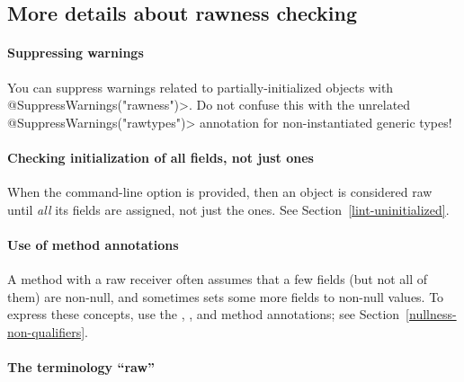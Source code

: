 


\subsection{More details about rawness checking\label{rawness-checking}}


\paragraph{Suppressing warnings}

You can suppress warnings related to partially-initialized objects with
\<@SuppressWarnings("rawness")>.  Do not confuse this with the unrelated
\<@SuppressWarnings("rawtypes")> annotation for non-instantiated generic types!


\paragraph{Checking initialization of all fields, not just  ones}

When the  command-line option is provided, then
an object is considered raw until \emph{all} its fields are assigned, not
just the  ones.  See Section~\ref{lint-uninitialized}.


\paragraph{Use of method annotations}

A method with a raw receiver often assumes that a few fields (but not all
of them) are non-null, and sometimes sets some more fields to non-null
values.  To express these concepts, use the
,
, and
 method annotations;
see Section~\ref{nullness-non-qualifiers}.


\paragraph{The terminology ``raw''}

